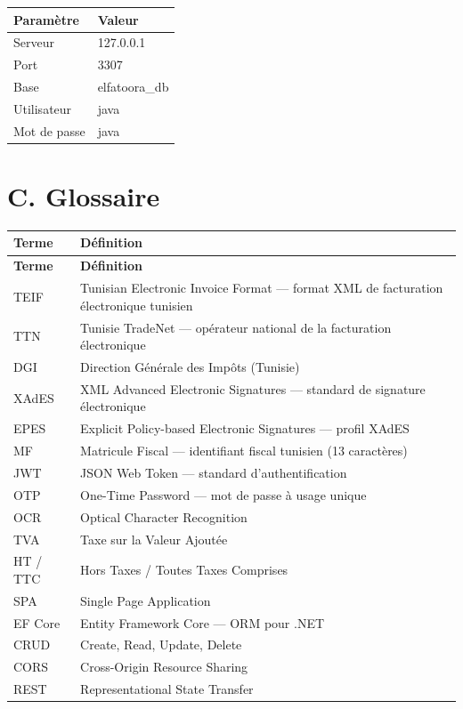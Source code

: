\documentclass[a4paper,12pt]{report}
\begin{document}
\begin{table}[htbp]
\centering
\begin{tabular}{|l|l|}
\hline
\textbf{Paramètre} & \textbf{Valeur} \\
\hline
Serveur & 127.0.0.1 \\
\hline
Port & 3307 \\
\hline
Base & elfatoora\_db \\
\hline
Utilisateur & java \\
\hline
Mot de passe & java \\
\hline
\end{tabular}
\end{table}

\section*{C. Glossaire}

\begin{longtable}{|l|p{10cm}|}
\hline
\textbf{Terme} & \textbf{Définition} \\
\hline
\endfirsthead \hline \textbf{Terme} & \textbf{Définition} \\ \hline \endhead
TEIF & Tunisian Electronic Invoice Format — format XML de facturation électronique tunisien \\ \hline
TTN & Tunisie TradeNet — opérateur national de la facturation électronique \\ \hline
DGI & Direction Générale des Impôts (Tunisie) \\ \hline
XAdES & XML Advanced Electronic Signatures — standard de signature électronique \\ \hline
EPES & Explicit Policy-based Electronic Signatures — profil XAdES \\ \hline
MF & Matricule Fiscal — identifiant fiscal tunisien (13 caractères) \\ \hline
JWT & JSON Web Token — standard d'authentification \\ \hline
OTP & One-Time Password — mot de passe à usage unique \\ \hline
OCR & Optical Character Recognition \\ \hline
TVA & Taxe sur la Valeur Ajoutée \\ \hline
HT / TTC & Hors Taxes / Toutes Taxes Comprises \\ \hline
SPA & Single Page Application \\ \hline
EF Core & Entity Framework Core — ORM pour .NET \\ \hline
CRUD & Create, Read, Update, Delete \\ \hline
CORS & Cross-Origin Resource Sharing \\ \hline
REST & Representational State Transfer \\ \hline
\end{longtable}
\end{document}
